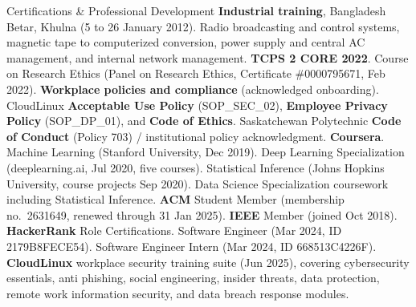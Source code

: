 \begin{rubric}{Certifications \& Professional Development}
\vspace{-1mm}
\entry*[Betar]%
	\textbf{Industrial training}, Bangladesh Betar, Khulna (5 to 26 January 2012). Radio broadcasting and control systems, magnetic tape to computerized conversion, power supply and central AC management, and internal network management.
\vspace{-1mm}
\entry*[Ethics]%
	\textbf{TCPS 2 CORE 2022}. Course on Research Ethics (Panel on Research Ethics, Certificate \#0000795671, Feb 2022).
\vspace{-1mm}
\entry*[Policies]%
	\textbf{Workplace policies and compliance} (acknowledged onboarding). CloudLinux \textbf{Acceptable Use Policy} (SOP\_SEC\_02), \textbf{Employee Privacy Policy} (SOP\_DP\_01), and \textbf{Code of Ethics}. Saskatchewan Polytechnic \textbf{Code of Conduct} (Policy 703) / institutional policy acknowledgment.
\vspace{-1mm}
\entry*[Coursera]%
	\textbf{Coursera}. Machine Learning (Stanford University, Dec 2019). Deep Learning Specialization (deeplearning.ai, Jul 2020, five courses). Statistical Inference (Johns Hopkins University, course projects Sep 2020). Data Science Specialization coursework including Statistical Inference.
\vspace{-1mm}
\entry*[Members]%
	\textbf{ACM} Student Member (membership no.\ 2631649, renewed through 31 Jan 2025). \textbf{IEEE} Member (joined Oct 2018).
\vspace{-1mm}
\entry*[HackerRank]%
	\textbf{HackerRank} Role Certifications. Software Engineer (Mar 2024, ID 2179B8FECE54). Software Engineer Intern (Mar 2024, ID 668513C4226F).
\vspace{-1mm}
\entry*[Security]%
	\textbf{CloudLinux} workplace security training suite (Jun 2025), covering cybersecurity essentials, anti phishing, social engineering, insider threats, data protection, remote work information security, and data breach response modules.
\end{rubric}
